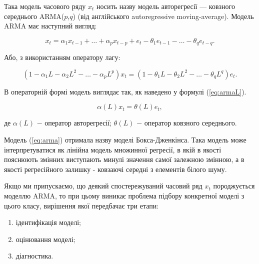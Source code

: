 Така модель часового ряду $x_{t}$ носить назву модель авторегресії — ковзного середнього ARMA($p$,$q$) (від англійського autoregressive moving-average). Модель ARMA має наступний вигляд:

\begin{equation}\label{eq:arma}
x_{t} = \alpha_{1}x_{t-1} + \dots + \alpha_{p}x_{t-p} + e_{t} - \theta_{1}e_{t-1} - \dots - \theta_{q}e_{t-q}.
\end{equation}

\vspace{1.5em}

Або, з використанням оператору лагу:

\begin{equation}
(1 - \alpha_{1}L - \alpha_{2}L^{2} - \dots - \alpha_{p}L^{p})x_{t} = (1 - \theta_{1}L - \theta_{2}L^{2} - \dots - \theta_{q}L^{q})e_{t}.
\end{equation}

\vspace{1.5em}

В операторній формі модель виглядає так, як наведено у формулі (\ref{eq:armaL}).

\begin{equation}\label{eq:armaL}
\alpha(L)x_{t} = \theta(L)e_{t},
\end{equation}

\noindent де $\alpha(L)$ $-$ оператор авторегресії; \newline
\hspace*{15pt} $\theta(L)$ $-$ оператор ковзного середнього.

\vspace{1.5em}

Модель (\ref{eq:arma}) отримала назву моделі Бокса-Дженкінса. Така модель може інтерпретуватися як лінійна модель множинної регресії, в якій в якості пояснюють змінних виступають минулі значення самої залежною змінною, а в якості регресійного залишку - ковзаючі середні з елементів білого шуму.

Якщо ми припускаємо, що деякий спостережуваний часовий ряд $x_{t}$ породжується моделлю ARMA, то при цьому виникає проблема підбору конкретної моделі з цього класу, вирішення якої передбачає три етапи:

\begin{enumerate}
	\item ідентифікація моделі;
	\item оцінювання моделі;
	\item діагностика.
\end{enumerate}

